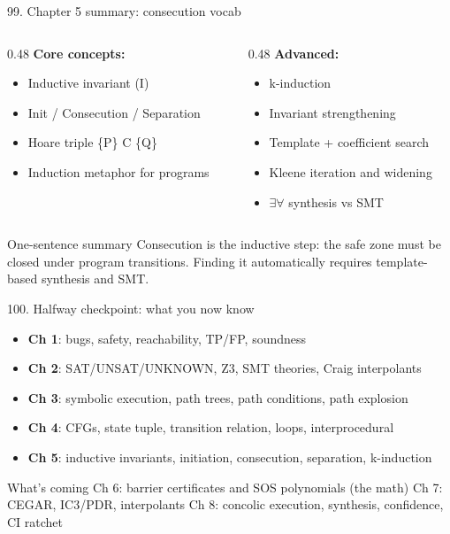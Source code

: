 \documentclass[aspectratio=169]{beamer}
\begin{document}
\begin{frame}{99. Chapter 5 summary: consecution vocab}
\begin{columns}
\begin{column}{0.48\textwidth}
\textbf{Core concepts:}
\begin{itemize}
  \item Inductive invariant (I)
  \item Init / Consecution / Separation
  \item Hoare triple \{P\} C \{Q\}
  \item Induction metaphor for programs
\end{itemize}
\end{column}
\begin{column}{0.48\textwidth}
\textbf{Advanced:}
\begin{itemize}
  \item k-induction
  \item Invariant strengthening
  \item Template + coefficient search
  \item Kleene iteration and widening
  \item $\exists\forall$ synthesis vs SMT
\end{itemize}
\end{column}
\end{columns}
\begin{block}{One-sentence summary}
Consecution is the inductive step: the safe zone must be closed under program transitions.
Finding it automatically requires template-based synthesis and SMT.
\end{block}
\end{frame}

\begin{frame}{100. Halfway checkpoint: what you now know}
\begin{itemize}
  \item \textbf{Ch 1}: bugs, safety, reachability, TP/FP, soundness
  \item \textbf{Ch 2}: SAT/UNSAT/UNKNOWN, Z3, SMT theories, Craig interpolants
  \item \textbf{Ch 3}: symbolic execution, path trees, path conditions, path explosion
  \item \textbf{Ch 4}: CFGs, state tuple, transition relation, loops, interprocedural
  \item \textbf{Ch 5}: inductive invariants, initiation, consecution, separation, k-induction
\end{itemize}
\vspace{0.5em}
\begin{block}{What's coming}
Ch 6: barrier certificates and SOS polynomials (the math) \quad
Ch 7: CEGAR, IC3/PDR, interpolants \quad
Ch 8: concolic execution, synthesis, confidence, CI ratchet
\end{block}
\end{frame}
\end{document}
